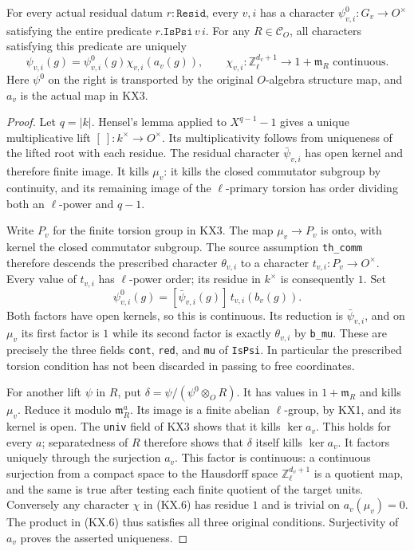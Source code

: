 \begin{proposition}
\label{claim:KX4}
For every actual residual datum $r:\texttt{Resid}$, every $v,i$
has a character $\psi^0_{v,i}:G_v\to O^\times$ satisfying the
entire predicate $r.\texttt{IsPsi}\,v\,i$.
For any $R\in\mathcal C_O$, all characters satisfying this
predicate are uniquely
\[
 \psi_{v,i}(g)=\psi^0_{v,i}(g)
                 \chi_{v,i}(a_v(g)),\qquad
 \chi_{v,i}:\mathbb Z_\ell^{d_v+1}\to1+\mathfrak m_R
                         \text{ continuous}.
                                                               \tag{KX.6}
\]
Here $\psi^0$ on the right is transported by the original
$O$-algebra structure map, and $a_v$ is the actual map in KX3.
\end{proposition}
\begin{proof}
Let $q=|k|$.  Hensel's lemma applied to $X^{q-1}-1$ gives a unique
multiplicative lift $[\ ]:k^\times\to O^\times$.
Its multiplicativity follows from uniqueness of the lifted root
with each residue.  The residual character $\bar\psi_{v,i}$ has
open kernel and therefore finite image.  It kills $\mu_v$:
it kills the closed commutator subgroup by continuity, and its
remaining image of the $\ell$-primary torsion has order dividing
both an $\ell$-power and $q-1$.

Write $P_v$ for the finite torsion group in KX3.  The map
$\mu_v\to P_v$ is onto, with kernel the closed commutator
subgroup.  The source assumption \texttt{th\_comm} therefore
descends the prescribed character $\theta_{v,i}$ to a character
$t_{v,i}:P_v\to O^\times$.  Every value of $t_{v,i}$ has
$\ell$-power order; its residue in $k^\times$ is consequently $1$.
Set
\[
            \psi^0_{v,i}(g)
              =[\bar\psi_{v,i}(g)]\,t_{v,i}(b_v(g)).
                                                               \tag{KX.7}
\]
Both factors have open kernels, so this is continuous.  Its
reduction is $\bar\psi_{v,i}$, and on $\mu_v$ its first factor is
$1$ while its second factor is exactly $\theta_{v,i}$ by
\texttt{b\_mu}.  These are precisely the three fields
\texttt{cont}, \texttt{red}, and \texttt{mu} of \texttt{IsPsi}.
In particular the prescribed torsion condition has not been
discarded in passing to free coordinates.

For another lift $\psi$ in $R$, put
$\delta=\psi/(\psi^0\otimes_OR)$.  It has values in
$1+\mathfrak m_R$ and kills $\mu_v$.  Reduce it modulo
$\mathfrak m_R^a$.  Its image is a finite abelian $\ell$-group,
by KX1, and its kernel is open.  The \texttt{univ} field of
KX3 shows that it kills $\ker a_v$.  This holds for every $a$;
separatedness of $R$ therefore shows that $\delta$ itself kills
$\ker a_v$.  It factors uniquely through the surjection $a_v$.
This factor is continuous: a continuous surjection from a compact
space to the Hausdorff space $\mathbb Z_\ell^{d_v+1}$ is a
quotient map, and the same is true after testing each finite
quotient of the target units.  Conversely any character $\chi$
in (KX.6) has residue $1$ and is trivial on $a_v(\mu_v)=0$.
The product in (KX.6) thus satisfies all three original conditions.
Surjectivity of $a_v$ proves the asserted uniqueness.
\end{proof}

